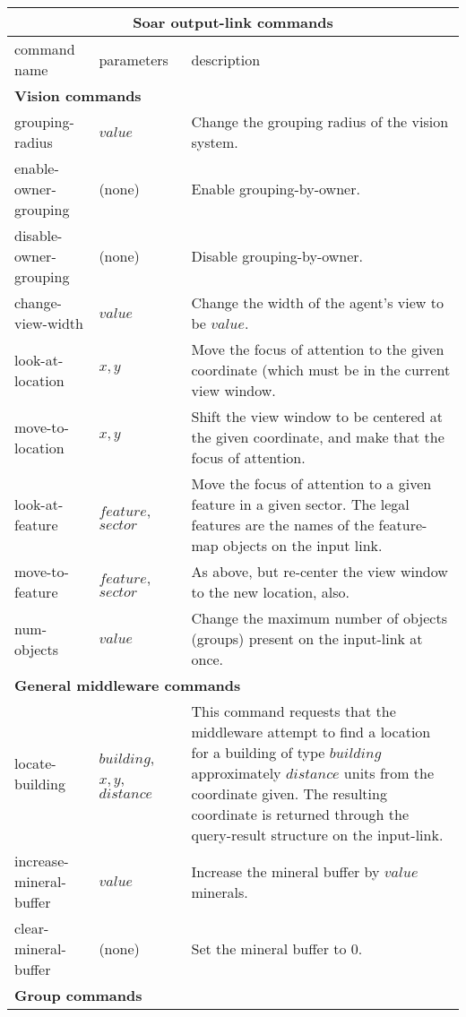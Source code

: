 \begin{center}
\begin{minipage}{6.5in}
\begin{tabular}{|l|p{1.0in}|p{3.5in}|}
\hline
\multicolumn{3}{|c|}{\textbf{Soar output-link commands}}\\ 
\hline
command name &  parameters & description \\
\hline \hline
\multicolumn{3}{|l|}{\textbf{Vision commands}}\\ 
\hline
grouping-radius & $value$ & Change the grouping radius of the vision system. \\
\hline
enable-owner-grouping & (none) & Enable grouping-by-owner.\\
\hline
disable-owner-grouping & (none) & Disable grouping-by-owner.\\
\hline
change-view-width & $value$ & Change the width of the agent's view to be $value$.\\
\hline 
look-at-location & $x,y$ & Move the focus of attention to the given coordinate (which must be in the current view window.\\
\hline
move-to-location & $x,y$ & Shift the view window to be centered at the given coordinate, and make that the focus of attention. \\
\hline
look-at-feature & $feature$, $sector$ & Move the focus of attention to a given feature in a given sector. The legal features are the names of the feature-map objects on the input link.\\
\hline
move-to-feature & $feature$, $sector$ & As above, but re-center the view window to the new location, also.\\
\hline
num-objects & $value$ & Change the maximum number of objects (groups) present on the input-link at once.\\
\hline
\multicolumn{3}{|l|}{\textbf{General middleware commands}}\\ 
\hline
locate-building & $building$, $x,y$, $distance$ & This command requests that the middleware attempt to find a location for a building of type $building$ approximately $distance$ units from the coordinate given. The resulting coordinate is returned through the query-result structure on the input-link. \\
\hline
increase-mineral-buffer & $value$ & Increase the mineral buffer by $value$ minerals.\\
\hline
clear-mineral-buffer & (none) & Set the mineral buffer to 0.\\
\hline
\multicolumn{3}{|l|}{\textbf{Group commands}}\\

\end{tabular}
\end{minipage}
\end{center}
